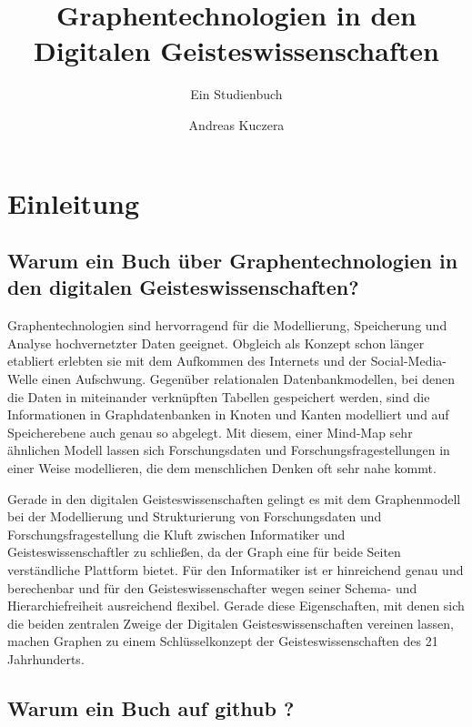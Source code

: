 \documentclass[ngerman,]{scrreprt}
\title{Graphentechnologien in den Digitalen Geisteswissenschaften}
\subtitle{Ein Studienbuch}
\author{Andreas Kuczera}
\date{}
\begin{document}
\maketitle

{
\hypersetup{linkcolor=black}
\setcounter{tocdepth}{2}
\tableofcontents
}
\chapter{Einleitung}\label{einleitung}

\section{Warum ein Buch über Graphentechnologien in den digitalen Geisteswissenschaften?}\label{warum-ein-buch-uxfcber-graphentechnologien-in-den-digitalen-geisteswissenschaften}

Graphentechnologien sind hervorragend für die Modellierung, Speicherung und Analyse hochvernetzter Daten geeignet. Obgleich als Konzept schon länger etabliert erlebten sie mit dem Aufkommen des Internets und der Social-Media-Welle einen Aufschwung. Gegenüber relationalen Datenbankmodellen, bei denen die Daten in miteinander verknüpften Tabellen gespeichert werden, sind die Informationen in Graphdatenbanken in Knoten und Kanten modelliert und auf Speicherebene auch genau so abgelegt. Mit diesem, einer Mind-Map sehr ähnlichen Modell lassen sich Forschungsdaten und Forschungsfragestellungen in einer Weise modellieren, die dem menschlichen Denken oft sehr nahe kommt.

Gerade in den digitalen Geisteswissenschaften gelingt es mit dem Graphenmodell bei der Modellierung und Strukturierung von Forschungsdaten und Forschungsfragestellung die Kluft zwischen Informatiker und Geisteswissenschaftler zu schließen, da der Graph eine für beide Seiten verständliche Plattform bietet. Für den Informatiker ist er hinreichend genau und berechenbar und für den Geisteswissenschafter wegen seiner Schema- und Hierarchiefreiheit ausreichend flexibel. Gerade diese Eigenschaften, mit denen sich die beiden zentralen Zweige der Digitalen Geisteswissenschaften vereinen lassen, machen Graphen zu einem Schlüsselkonzept der Geisteswissenschaften des 21 Jahrhunderts.

\section{Warum ein Buch auf github ?}\label{warum-ein-buch-auf-github}
\end{document}

